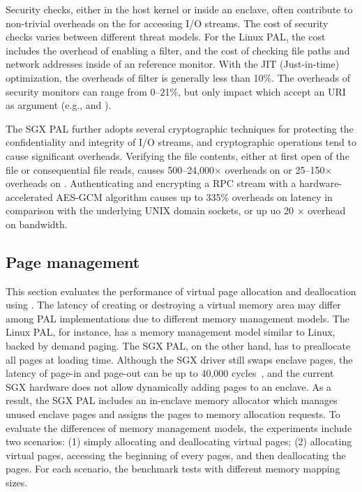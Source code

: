 Security checks, either in the host kernel or inside an enclave,
often contribute to
non-trivial overheads on the \hostapis{} for accessing I/O streams.
The cost of security checks
varies between different threat models.
For the Linux PAL, the cost includes the overhead of enabling a \seccomp{} filter, and the cost of checking file paths and network addresses
inside of an reference monitor.
With the JIT (Just-in-time) optimization,
the overheads of \seccomp{} filter is generally less than 10\%.
The overheads of security monitors can range from 0--21\%, but only impact \hostapis{} which accept an URI as argument (e.g.,  and ).

 
The SGX PAL further adopts several cryptographic techniques
for protecting the confidentiality and integrity of I/O streams, and cryptographic operations tend to cause significant overheads.
Verifying the file contents, either at first open of the file or consequential file reads,
causes 500--24,000$\times$ overheads on 
or 25--150$\times$ overheads on .
Authenticating and encrypting a RPC stream with a hardware-accelerated AES-GCM algorithm
causes up to 335\% overheads on latency in comparison with
the underlying UNIX domain sockets,
or up uo \roughly{}20 $\times$ overhead on bandwidth.






\subsection{Page management}
\label{sec:eval:pal:memory}


This section evaluates the performance of virtual page allocation and deallocation
using \thehostabi{}.
The latency of creating or destroying a virtual memory area
may differ among PAL implementations
due to different memory management models.
The Linux PAL, for instance, has a memory management model
similar to Linux,
backed by demand paging.
The SGX PAL, on the other hand, has to preallocate all pages at loading time.
Although the SGX driver still swaps enclave pages,
the latency of page-in and page-out can be up to 40,000 cycles~\cite{orenbach17eleos},
and the current SGX hardware does not allow dynamically adding pages
to an enclave.
As a result, the SGX PAL includes an in-enclave memory allocator
which manages unused enclave pages
and assigns the pages to memory allocation requests.
To evaluate
the differences of memory management models,
the experiments
include two scenarios:
(1) simply allocating and deallocating virtual pages;
(2) allocating virtual pages,
accessing the beginning of every pages,
and then deallocating the pages.
For each scenario,
the benchmark tests with different memory mapping sizes.





